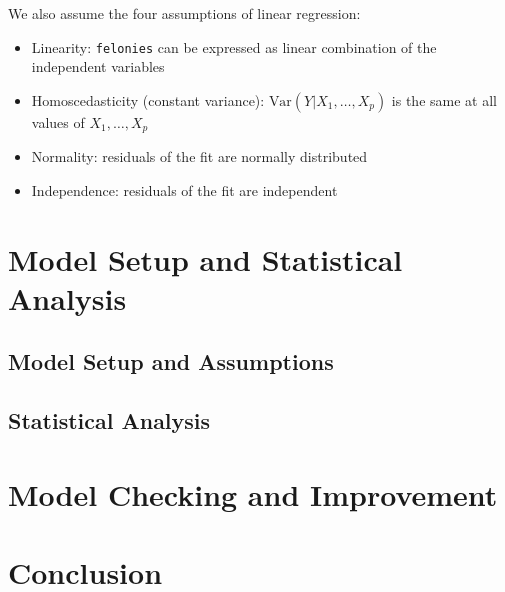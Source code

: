 \documentclass[11pt,notitlepage]{article}
\begin{document}
We also assume the four assumptions of linear regression:
\begin{itemize}
\setlength\itemsep{-1pt}

\item Linearity: \texttt{felonies} can be expressed as linear combination of the independent variables
\item Homoscedasticity (constant variance): $\text{Var}(Y|X_1,\ldots, X_p)$ is the same at all values of $X_1,\ldots, X_p$
\item Normality: residuals of the fit are normally distributed
\item Independence: residuals of the fit are independent
\end{itemize}








\section{Model Setup and Statistical Analysis}

\subsection{Model Setup and Assumptions}
\label{sec:linearRegressionModelAndAssumptions}

\subsection{Statistical Analysis}
\label{sec:statisticalAnalysisAndInference}


\section{Model Checking and Improvement}
\label{sec:modelChecking}

\section{Conclusion}
\label{sec:conclusion}



\listoftodos

\pagebreak

%
%
\end{document}
